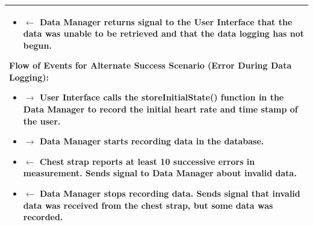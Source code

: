 \documentclass[letterpaper,english, 12pt]{scrreprt}
\begin{document}
\begin{center}
\begin{longtable}{|C{15cm}|}
\begin{itemize}
                                        \item $\leftarrow$ Data Manager returns signal to the User Interface that the data was unable to be retrieved and that the data logging has not begun.
                                \end{itemize}
                        \begin{flushleft}
                                \textbf{Flow of Events for Alternate Success Scenario (Error During Data Logging): }
                        \end{flushleft}
                                \begin{itemize}
                                        \item $\rightarrow$ User Interface calls the storeInitialState() function in the Data Manager to record the initial heart rate and time stamp of the user.
                                        \item $\rightarrow$ Data Manager starts recording data in the database.
                                        \item $\leftarrow$ Chest strap reports at least 10 successive errors in measurement. Sends signal to Data Manager about invalid data.
                                        \item $\leftarrow$ Data Manager stops recording data. Sends signal that invalid data was received from the chest strap, but some data was recorded.
                                \end{itemize}
                                \\
                \hline
        \end{longtable}
\end{center}
\end{document}
